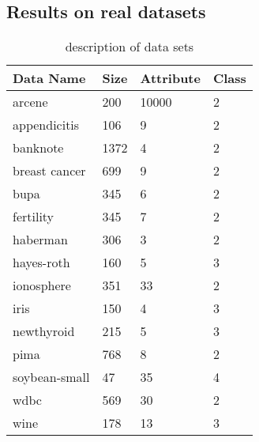 	\subsection{Results on real datasets}
		\begin{table}[htb]
	      \centering
	      \caption{description of data sets}
	      \label{my-label}
	      \begin{tabular}{|llll|}
	        \hline
	         Data Name & Size  & Attribute  & Class  \\ \hline
	         arcene 		& 200 	& 10000 & 2  \\ 
	         appendicitis 	& 106 	& 9 & 2 \\ 
	         banknote 		& 1372 	& 4 & 2 \\ 
	         breast cancer 	& 699 	& 9 & 2 \\ 
	         bupa 			& 345 	& 6 & 2 \\ 
	         fertility 		& 345 	& 7 & 2 \\ 
	         haberman 		& 306 	& 3 & 2 \\ 
	         hayes-roth 	& 160 	& 5 & 3 \\ 
	         ionosphere 	& 351 	& 33& 2 \\ 
	         iris 			& 150 	& 4 & 3 \\ 
	         newthyroid 	& 215 	& 5 & 3 \\ 
	         pima 			& 768 	& 8 & 2 \\ 
	         soybean-small 	& 47 	& 35& 4 \\ 
	         wdbc 			& 569 	& 30& 2 \\ 
	         wine 			& 178 	& 13& 3 \\ 
	         \hline
	      \end{tabular}
    	\end{table}

